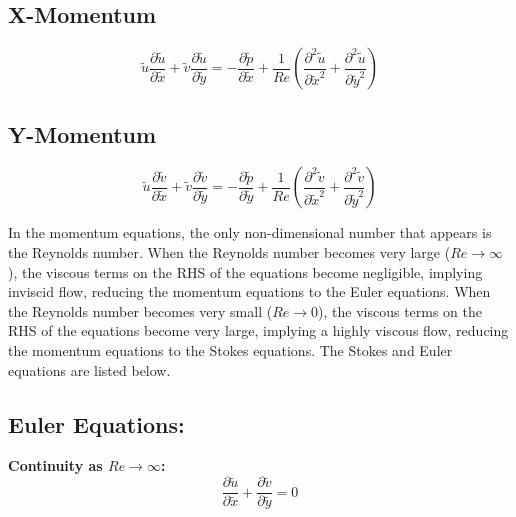 \documentclass[11pt]{article}
\begin{document}
\subsection*{X-Momentum}
\begin{equation*}
    \tilde{u} \frac{\partial \tilde{u}}{\partial \tilde{x}} + \tilde{v} \frac{\partial \tilde{u}}{\partial \tilde{y}} = -\frac{\partial \tilde{p}}{\partial \tilde{x}} + \frac{1}{Re}\left(\frac{\partial^2 \tilde{u}}{\partial \tilde{x}^2} + \frac{\partial^2 \tilde{u}}{\partial \tilde{y}^2}\right)
\end{equation*}

\subsection*{Y-Momentum}
\begin{equation*}
    \tilde{u} \frac{\partial \tilde{v}}{\partial \tilde{x}} + \tilde{v} \frac{\partial \tilde{v}}{\partial \tilde{y}} = -\frac{\partial \tilde{p}}{\partial \tilde{y}} + \frac{1}{Re}\left(\frac{\partial^2 \tilde{v}}{\partial \tilde{x}^2} + \frac{\partial^2 \tilde{v}}{\partial \tilde{y}^2}\right)
\end{equation*}

In the momentum equations, the only non-dimensional number that appears is the Reynolds number. When the Reynolds number becomes very large ($Re \rightarrow \infty$), the viscous terms on the RHS of the equations become negligible, implying inviscid flow, reducing the momentum equations to the Euler equations. When the Reynolds number becomes very small ($Re \rightarrow 0$), the viscous terms on the RHS of the equations become very large, implying a highly viscous flow, reducing the momentum equations to the Stokes equations. The Stokes and Euler equations are listed below. 
\vspace{5mm}

\subsection*{Euler Equations:}

\vspace{5mm}

\textbf{Continuity as $Re \rightarrow \infty$:}
\begin{equation*}
\frac{\partial \tilde{u}}{\partial \tilde{x}} + \frac{\partial \tilde{v}}{\partial \tilde{y}} = 0
\end{equation*}

\vspace{2.5mm}
\end{document}
